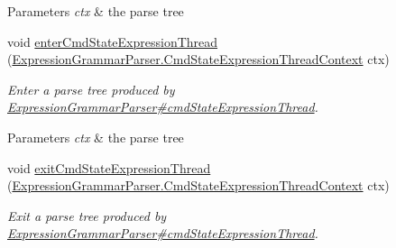 \begin{DoxyCompactItemize}
\begin{DoxyCompactList}
\begin{DoxyParams}{Parameters}
{\em ctx} & the parse tree\\
\hline
\end{DoxyParams}
 \end{DoxyCompactList}\item 
void \hyperlink{classgov_1_1nasa_1_1jpf_1_1inspector_1_1server_1_1expression_1_1parser_1_1_expression_grammar_base_listener_a799a706362d175cb196853b1cf4d3334}{enter\+Cmd\+State\+Expression\+Thread} (\hyperlink{classgov_1_1nasa_1_1jpf_1_1inspector_1_1server_1_1expression_1_1parser_1_1_expression_grammar_paf34f6c6cf6d3cef851c12971caa03ed5}{Expression\+Grammar\+Parser.\+Cmd\+State\+Expression\+Thread\+Context} ctx)
\begin{DoxyCompactList}\small\item\em Enter a parse tree produced by \hyperlink{classgov_1_1nasa_1_1jpf_1_1inspector_1_1server_1_1expression_1_1parser_1_1_expression_grammar_parser_aa1d5db45ac1bf7eceb29571e40f51853}{Expression\+Grammar\+Parser\#cmd\+State\+Expression\+Thread}.


\begin{DoxyParams}{Parameters}
{\em ctx} & the parse tree\\
\hline
\end{DoxyParams}
 \end{DoxyCompactList}\item 
void \hyperlink{classgov_1_1nasa_1_1jpf_1_1inspector_1_1server_1_1expression_1_1parser_1_1_expression_grammar_base_listener_ac3e946085f8162fa6dc27ec6e5dabc66}{exit\+Cmd\+State\+Expression\+Thread} (\hyperlink{classgov_1_1nasa_1_1jpf_1_1inspector_1_1server_1_1expression_1_1parser_1_1_expression_grammar_paf34f6c6cf6d3cef851c12971caa03ed5}{Expression\+Grammar\+Parser.\+Cmd\+State\+Expression\+Thread\+Context} ctx)
\begin{DoxyCompactList}\small\item\em Exit a parse tree produced by \hyperlink{classgov_1_1nasa_1_1jpf_1_1inspector_1_1server_1_1expression_1_1parser_1_1_expression_grammar_parser_aa1d5db45ac1bf7eceb29571e40f51853}{Expression\+Grammar\+Parser\#cmd\+State\+Expression\+Thread}.



\end{DoxyCompactList}
\end{DoxyCompactItemize}
